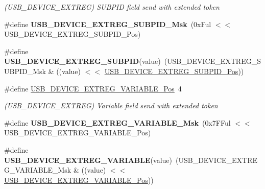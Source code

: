 \begin{DoxyCompactItemize}
\begin{DoxyCompactList}\small\item\em (U\+S\+B\+\_\+\+D\+E\+V\+I\+C\+E\+\_\+\+E\+X\+T\+R\+E\+G) S\+U\+B\+P\+I\+D field send with extended token \end{DoxyCompactList}\item 
\hypertarget{group___s_a_m_l21___u_s_b_ga1ac40b811a7e3396bf75111ac3c651fd}{}\#define {\bfseries U\+S\+B\+\_\+\+D\+E\+V\+I\+C\+E\+\_\+\+E\+X\+T\+R\+E\+G\+\_\+\+S\+U\+B\+P\+I\+D\+\_\+\+Msk}~(0x\+Ful $<$$<$ U\+S\+B\+\_\+\+D\+E\+V\+I\+C\+E\+\_\+\+E\+X\+T\+R\+E\+G\+\_\+\+S\+U\+B\+P\+I\+D\+\_\+\+Pos)\label{group___s_a_m_l21___u_s_b_ga1ac40b811a7e3396bf75111ac3c651fd}

\item 
\hypertarget{group___s_a_m_l21___u_s_b_ga8c9b03460ec45ab4350f5af0a7ea1b1f}{}\#define {\bfseries U\+S\+B\+\_\+\+D\+E\+V\+I\+C\+E\+\_\+\+E\+X\+T\+R\+E\+G\+\_\+\+S\+U\+B\+P\+I\+D}(value)~(U\+S\+B\+\_\+\+D\+E\+V\+I\+C\+E\+\_\+\+E\+X\+T\+R\+E\+G\+\_\+\+S\+U\+B\+P\+I\+D\+\_\+\+Msk \& ((value) $<$$<$ \hyperlink{group___s_a_m_l21___u_s_b_gaaee8dcd3a757e47151ddd4d36545a469}{U\+S\+B\+\_\+\+D\+E\+V\+I\+C\+E\+\_\+\+E\+X\+T\+R\+E\+G\+\_\+\+S\+U\+B\+P\+I\+D\+\_\+\+Pos}))\label{group___s_a_m_l21___u_s_b_ga8c9b03460ec45ab4350f5af0a7ea1b1f}

\item 
\hypertarget{group___s_a_m_l21___u_s_b_gaf9a6b648d84872b8c9b566ce0e778a96}{}\#define \hyperlink{group___s_a_m_l21___u_s_b_gaf9a6b648d84872b8c9b566ce0e778a96}{U\+S\+B\+\_\+\+D\+E\+V\+I\+C\+E\+\_\+\+E\+X\+T\+R\+E\+G\+\_\+\+V\+A\+R\+I\+A\+B\+L\+E\+\_\+\+Pos}~4\label{group___s_a_m_l21___u_s_b_gaf9a6b648d84872b8c9b566ce0e778a96}

\begin{DoxyCompactList}\small\item\em (U\+S\+B\+\_\+\+D\+E\+V\+I\+C\+E\+\_\+\+E\+X\+T\+R\+E\+G) Variable field send with extended token \end{DoxyCompactList}\item 
\hypertarget{group___s_a_m_l21___u_s_b_ga1ad3c27f4944051059ace965df14dd87}{}\#define {\bfseries U\+S\+B\+\_\+\+D\+E\+V\+I\+C\+E\+\_\+\+E\+X\+T\+R\+E\+G\+\_\+\+V\+A\+R\+I\+A\+B\+L\+E\+\_\+\+Msk}~(0x7\+F\+Ful $<$$<$ U\+S\+B\+\_\+\+D\+E\+V\+I\+C\+E\+\_\+\+E\+X\+T\+R\+E\+G\+\_\+\+V\+A\+R\+I\+A\+B\+L\+E\+\_\+\+Pos)\label{group___s_a_m_l21___u_s_b_ga1ad3c27f4944051059ace965df14dd87}

\item 
\hypertarget{group___s_a_m_l21___u_s_b_ga56bade640a4e642cf88e77b1e25b77fb}{}\#define {\bfseries U\+S\+B\+\_\+\+D\+E\+V\+I\+C\+E\+\_\+\+E\+X\+T\+R\+E\+G\+\_\+\+V\+A\+R\+I\+A\+B\+L\+E}(value)~(U\+S\+B\+\_\+\+D\+E\+V\+I\+C\+E\+\_\+\+E\+X\+T\+R\+E\+G\+\_\+\+V\+A\+R\+I\+A\+B\+L\+E\+\_\+\+Msk \& ((value) $<$$<$ \hyperlink{group___s_a_m_l21___u_s_b_gaf9a6b648d84872b8c9b566ce0e778a96}{U\+S\+B\+\_\+\+D\+E\+V\+I\+C\+E\+\_\+\+E\+X\+T\+R\+E\+G\+\_\+\+V\+A\+R\+I\+A\+B\+L\+E\+\_\+\+Pos}))\label{group___s_a_m_l21___u_s_b_ga56bade640a4e642cf88e77b1e25b77fb}


\end{DoxyCompactItemize}
